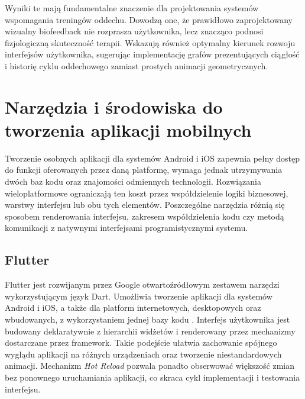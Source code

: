 Wyniki te mają fundamentalne znaczenie dla projektowania systemów wspomagania treningów oddechu. Dowodzą one, że prawidłowo zaprojektowany wizualny biofeedback nie rozprasza użytkownika, lecz znacząco podnosi fizjologiczną skuteczność terapii. Wskazują również optymalny kierunek rozwoju interfejsów użytkownika, sugerując implementację grafów prezentujących ciągłość i historię cyklu oddechowego zamiast prostych animacji geometrycznych.

\section{Narzędzia i środowiska do tworzenia aplikacji mobilnych}
Tworzenie osobnych aplikacji dla systemów Android i iOS zapewnia pełny dostęp do funkcji oferowanych przez daną platformę, wymaga jednak utrzymywania dwóch baz kodu oraz znajomości odmiennych technologii. Rozwiązania wieloplatformowe ograniczają ten koszt przez współdzielenie logiki biznesowej, warstwy interfejsu lub obu tych elementów. Poszczególne narzędzia różnią się sposobem renderowania interfejsu, zakresem współdzielenia kodu czy metodą komunikacji z natywnymi interfejsami programistycznymi systemu.

\subsection{Flutter}
Flutter jest rozwijanym przez Google otwartoźródłowym zestawem narzędzi wykorzystującym język Dart. Umożliwia tworzenie aplikacji dla systemów Android i iOS, a także dla platform internetowych, desktopowych oraz wbudowanych, z wykorzystaniem jednej bazy kodu \cite{flutterDocs2026}. Interfejs użytkownika jest budowany deklaratywnie z hierarchii widżetów i renderowany przez mechanizmy dostarczane przez framework. Takie podejście ułatwia zachowanie spójnego wyglądu aplikacji na różnych urządzeniach oraz tworzenie niestandardowych animacji. Mechanizm \textit{Hot Reload} pozwala ponadto obserwować większość zmian bez ponownego uruchamiania aplikacji, co skraca cykl implementacji i testowania interfejsu.

